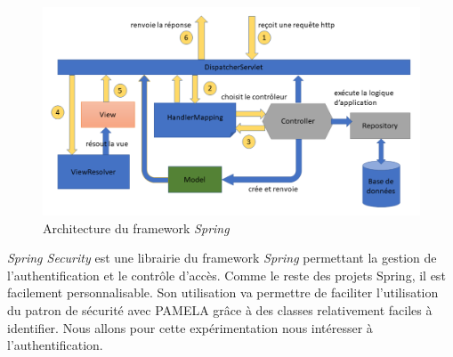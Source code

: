 \begin{figure}[!h]
    \centering
    \includegraphics[width=1.0 \columnwidth]{figures/ArchitectureSpring.png}
    \caption{Architecture du framework \textit{Spring}}
    \label{fig:ArchitectureSpring}
\end{figure}

\textit{Spring Security} est une librairie du framework \textit{Spring} permettant la gestion de l’authentification et le contrôle d’accès. Comme le reste des projets Spring, il est facilement personnalisable. Son utilisation va permettre de faciliter l’utilisation du patron de sécurité avec PAMELA grâce à des classes relativement faciles à identifier. Nous allons pour cette expérimentation nous intéresser à l'authentification.

